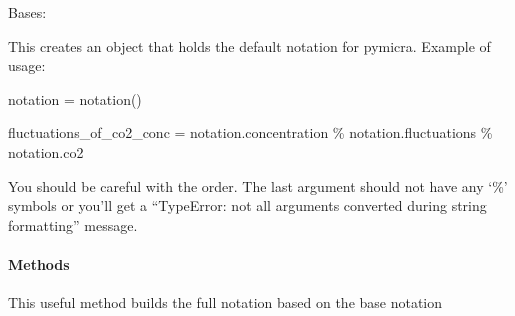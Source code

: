 \documentclass[a4paper,10pt,english]{sphinxmanual}
\begin{document}
\begin{fulllineitems}
\label{pymicra:pymicra.core.Notation}
Bases: 

This creates an object that holds the default notation for pymicra.
Example of usage:

notation = notation()

fluctuations\_of\_co2\_conc = notation.concentration \% notation.fluctuations \% notation.co2

You should be careful with the order. The last argument should not have any `\%' symbols
or you'll get a ``TypeError: not all arguments converted during string formatting'' message.
\paragraph{Methods}

\begin{fulllineitems}
\label{pymicra:pymicra.core.Notation.build}
This useful method builds the full notation based on the base notation

\end{fulllineitems}


\begin{fulllineitems}
\label{pymicra:pymicra.core.Notation.concentration}
\end{fulllineitems}


\begin{fulllineitems}
\label{pymicra:pymicra.core.Notation.cospectrum}
\end{fulllineitems}


\begin{fulllineitems}
\label{pymicra:pymicra.core.Notation.cross_spectrum}
\end{fulllineitems}


\end{fulllineitems}
\end{document}
